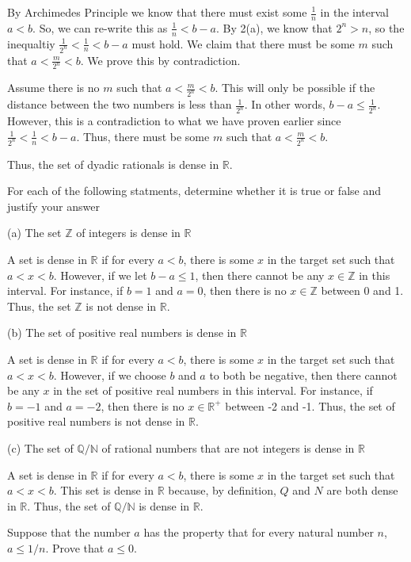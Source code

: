 \documentclass[addpoints]{exam}
\begin{document}
\begin{questions}
By Archimedes Principle we know that there must exist some $\frac{1}{n}$ in the interval 
$a < b$. So, we can re-write this as $\frac{1}{n} < b - a$.  By 2(a), we know that $2^n > n$, 
so the inequaltiy $\frac{1}{2^n} < \frac{1}{n} < b - a$ must hold. We claim that there must be 
some $m$ such that $a < \frac{m}{2^n} <b$. We prove this by contradiction. 

Assume there is no $m$ such that $a < \frac{m}{2^n} <b$. This will only be possible if 
the distance between the two numbers is less than $\frac{1}{2^n}$. In other words, 
$b - a \leq \frac{1}{2^n}$. However, this is a contradiction to what we have proven earlier 
since $\frac{1}{2^n} < \frac{1}{n} < b - a$. Thus, there must be some $m$ such that $a < \frac{m}{2^n} <b$.

Thus, the set of dyadic rationals is dense in $\mathbb{R}$.

\question For each of the following statments, determine whether it is true or false and 
justify your answer

(a) The set $\mathbb{Z}$ of integers is dense in $\mathbb{R}$

A set is dense in $\mathbb{R}$ if for every $a < b$, there is some $x$ in the target set
such that $a < x < b$. However, if we let $b - a \leq 1$, then there cannot be any $x \in \mathbb{Z}$
in this interval. For instance, if $b = 1$ and $a = 0$, then there is no $x \in \mathbb{Z}$ between
0 and 1. Thus, the set $\mathbb{Z}$ is not dense in $\mathbb{R}$.

(b) The set of positive real numbers is dense in $\mathbb{R}$

A set is dense in $\mathbb{R}$ if for every $a < b$, there is some $x$ in the target set
such that $a < x < b$. However, if we choose $b$ and $a$ to both be negative, then 
there cannot be any $x$ in the set of positive real numbers in this interval. For instance, if
$b = -1$ and $a = -2$, then there is no $x \in \mathbb{R}^+$ between -2 and -1. Thus, the set of
positive real numbers is not dense in $\mathbb{R}$.

(c) The set of $\mathbb{Q}/\mathbb{N}$ of rational numbers that are not integers is dense in $\mathbb{R}$

A set is dense in $\mathbb{R}$ if for every $a < b$, there is some $x$ in the target set
such that $a < x < b$. This set is dense in $\mathbb{R}$ because, by definition, $Q$ and $N$ are both 
dense in $\mathbb{R}$. Thus, the set of $\mathbb{Q}/\mathbb{N}$ is dense in $\mathbb{R}$. 

\question Suppose that the number $a$ has the property that for every natural number $n$, 
$a \leq 1/n$. Prove that $a \leq 0$. 


\end{questions}
\end{document}
